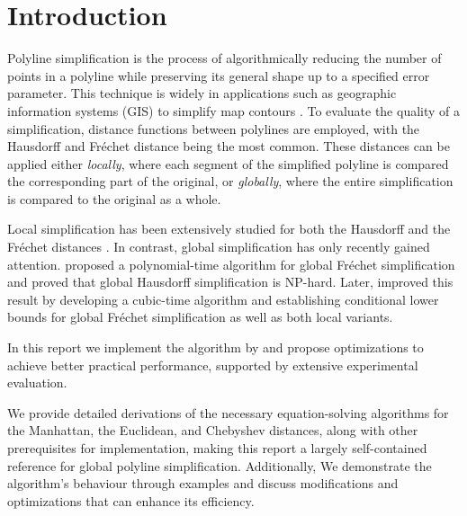\section{Introduction}
\label{sec:introduction}
Polyline simplification is the process of algorithmically reducing the number of points in a polyline while preserving its general shape up to a specified error parameter. This technique is widely in applications such as geographic information systems (GIS) to simplify map contours \cite{algorithms_reduction_number_points_caricature}. To evaluate the quality of a simplification, distance functions between polylines are employed, with the Hausdorff and Fréchet distance being the most common. These distances can be applied either \emph{locally}, where each segment of the simplified polyline is compared the corresponding part of the original, or \emph{globally}, where the entire simplification is compared to the original as a whole. 

Local simplification has been extensively studied for both the Hausdorff and the Fréchet distances \cite{polyline_simplification_under_the_local_frechet_distance_has_almost_quadratic_runtime_in_2d_storandtetal}\cite{computational_geometric_methods_for_polygonal_approximations_of_a_curve}. In contrast, global simplification has only recently gained attention. \citeauthor{on_optimal_polyline_simplification_using_the_hausdorff_and_frechet_distance} proposed a polynomial-time algorithm for global Fréchet simplification and proved that global Hausdorff simplification is NP-hard. Later, \citeauthor{polyline_simplification_has_cubic_complexity_bringmannetal} improved this result by developing a cubic-time algorithm and establishing conditional lower bounds for global Fréchet simplification as well as both local variants. 

In this report we implement the algorithm by \citeauthor{on_optimal_polyline_simplification_using_the_hausdorff_and_frechet_distance} and propose optimizations to achieve better practical performance, supported by extensive experimental evaluation. 

We provide detailed derivations of the necessary equation-solving algorithms for the Manhattan, the Euclidean, and Chebyshev distances, along with other prerequisites for implementation, making this report a largely self-contained reference for global polyline simplification. Additionally, We demonstrate the algorithm's behaviour through examples and discuss modifications and optimizations that can enhance its efficiency. 

